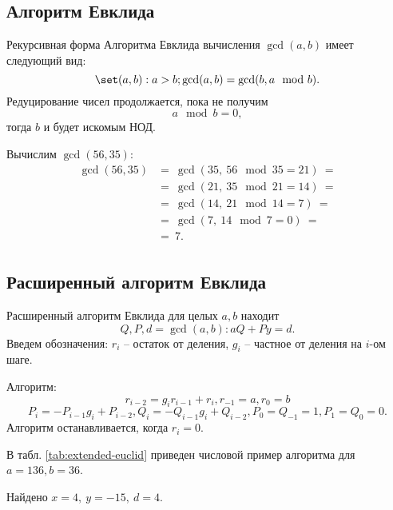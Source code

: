 \subsection{Алгоритм Евклида}

Рекурсивная форма Алгоритма Евклида вычисления $\gcd(a,b)$ имеет следующий вид:
    \[\set(a,b): a>b;  \gcd(a,b) = \gcd(b, a \mod b). \]
Редуцирование чисел продолжается, пока не получим
    \[ a \mod b = 0, \]
тогда $b$ и будет искомым НОД.

\example
Вычислим $\gcd(56, 35)$:
\[ \begin{array}{ll}
    \gcd(56, 35) & =~ \gcd(35, ~ 56 \mod 35 = 21) ~= \\
    & =~ \gcd(21, ~ 35 \mod 21 = 14) ~= \\
    & =~ \gcd(14, ~ 21 \mod 14 = 7) ~= \\
    & =~ \gcd(7, ~ 14 \mod 7 = 0) ~= \\
    & =~ 7. \\
\end{array} \]
\exampleend


\subsection{Расширенный алгоритм Евклида}

Расширенный алгоритм Евклида для целых $a,b$ находит
    \[ Q, P, d = \gcd(a,b): aQ + Py = d. \]
Введем обозначения: $r_i$ -- остаток от деления, $g_i$ -- частное от деления на $i$-ом шаге.

Алгоритм:
\[r_{i-2} = g_i r_{i-1}+r_i , r_{-1} = a, r_0 = b\]
\[P_i = -P_{i-1} g_i + P_{i-2}, Q_i = -Q_{i-1} g_i + Q_{i-2}, P_0 = Q_{-1} = 1, P_1 = Q_0 = 0.\]
Алгоритм останавливается, когда $r_i = 0$.


\example
В табл. \ref{tab:extended-euclid} приведен числовой пример алгоритма для $a=136, b=36$.
\begin{table}[h!]
    \centering
    \caption{Пример расширенного алгоритма Евклида для \\ $a=136, b=36$\label{tab:extended-euclid}}
\end{table}
Найдено $x = 4, ~ y = -15, ~ d = 4$.
\exampleend

